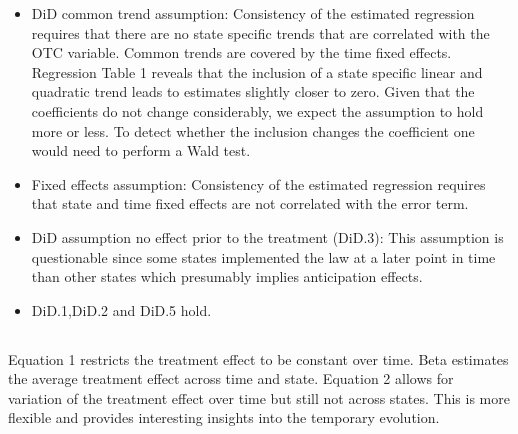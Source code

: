 \documentclass[%
  fontsize=11pt, %
  version=last,%
  headsepline,
  titlepage = false,
  DIV = 11, %
  abstract = false
]{scrartcl}
\begin{document}
\begin{itemize}
	\item DiD common trend assumption: Consistency of the estimated regression requires that there are no state specific 		trends that are correlated with the OTC variable. Common trends are covered by the time fixed effects. Regression Table 1 reveals that the inclusion of a state specific linear and quadratic trend leads to estimates slightly closer to zero. Given that the coefficients do not change considerably, we expect the assumption to hold more or less. To detect whether the inclusion changes the coefficient one would need to perform a Wald test. 
	
	\item Fixed effects assumption: Consistency of the estimated regression requires that state and time fixed effects are not correlated with the error term.
	
	\item DiD assumption no effect prior to the treatment (DiD.3): This assumption is questionable since some states implemented the law at a later point in time than other states which presumably implies anticipation effects.
	
	\item DiD.1,DiD.2 and DiD.5 hold.
\end{itemize}

\subsection{} %
Equation 1 restricts the treatment effect to be constant over time. Beta estimates the average treatment effect across time and state. Equation 2 allows for variation of the treatment effect over time but still not across states. This is more flexible and provides interesting insights into the temporary evolution.
\newpage
\end{document}
